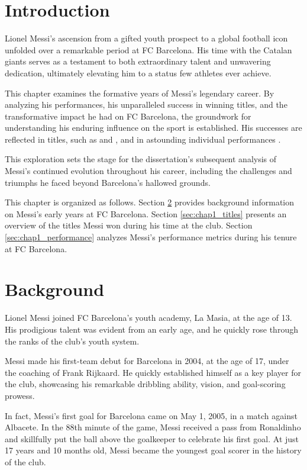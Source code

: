 
\section{Introduction}\label{sec:chap1_intro}
 
Lionel Messi's ascension from a gifted youth prospect to a global football icon 
unfolded over a remarkable period at FC Barcelona.
His time with the Catalan giants serves as a testament to both extraordinary 
talent and unwavering dedication, ultimately elevating him to a status few 
athletes ever achieve. 

This chapter examines the formative years of Messi's legendary career.
By analyzing his performances, his unparalleled success in winning titles, and 
the transformative impact he had on FC Barcelona, the groundwork for 
understanding his enduring influence on the sport is established.
His successes are reflected in titles, such as \textcite{messi2011ucl} 
and \textcite{messi2015ucl}, and in astounding individual performances
\parencite[e.g,][]{messi2009clasico}.

This exploration sets the stage for the dissertation's subsequent analysis of 
Messi's continued evolution throughout his career, 
including the challenges and triumphs he faced beyond Barcelona's hallowed grounds. 

This chapter is organized as follows. 
Section \ref{sec:chap1_background} provides background information on Messi's 
early years at FC Barcelona.
Section \ref{sec:chap1_titles} presents an overview of the titles Messi won 
during his time at the club.
Section \ref{sec:chap1_performance} analyzes Messi's performance metrics during 
his tenure at FC Barcelona.

\section{Background}\label{sec:chap1_background}

Lionel Messi joined FC Barcelona's youth academy, La Masia, at the age of 13.
His prodigious talent was evident from an early age, and he quickly rose through
the ranks of the club's youth system.

Messi made his first-team debut for Barcelona in 2004, at the age of 17, under 
the coaching of Frank Rijkaard.
He quickly established himself as a key player for the club, showcasing his
remarkable dribbling ability, vision, and goal-scoring prowess.

In fact, Messi's first goal for Barcelona came on May 1, 2005, in a match 
against Albacete.
In the 88th minute of the game, Messi received a pass from Ronaldinho and 
skillfully put the ball above the goalkeeper to celebrate his first goal.
At just 17 years and 10 months old, Messi became the youngest goal scorer in 
the history of the club.


